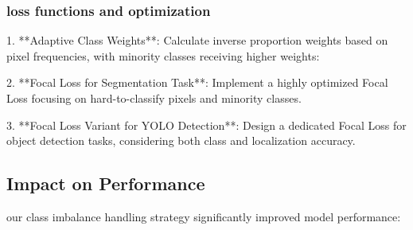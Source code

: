 \documentclass[conference]{IEEEtran}
\begin{document}
\subsubsection{loss functions and optimization}








1. **Adaptive Class Weights**: Calculate inverse proportion weights based on pixel frequencies, with minority classes receiving higher weights:

2. **Focal Loss for Segmentation Task**: Implement a highly optimized Focal Loss focusing on hard-to-classify pixels and minority classes.

3. **Focal Loss Variant for YOLO Detection**: Design a dedicated Focal Loss for object detection tasks, considering both class and localization accuracy.


\subsection{Impact on Performance}






our class imbalance handling strategy significantly improved model performance:
\end{document}
